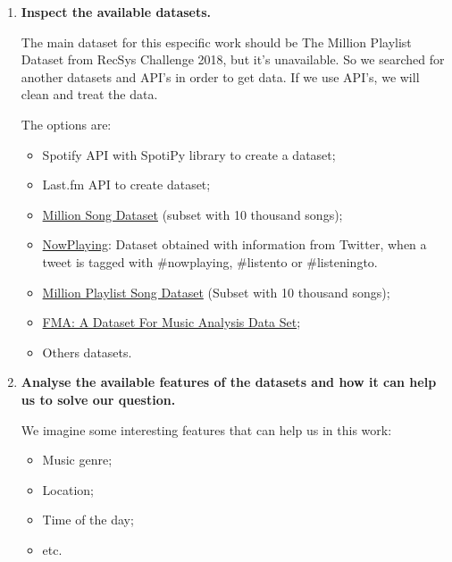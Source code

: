 \documentclass{article}
\begin{document}
    \begin{enumerate}
        \item \textbf{Inspect the available datasets.}
        
            The main dataset for this especific work should be The Million
            Playlist Dataset from RecSys Challenge 2018, but it's unavailable.
            So we searched for another datasets and API's in order to get data.
            If we use API's, we will clean and treat the data.
        
            The options are:

            \begin{itemize}
                \item Spotify API with SpotiPy library to create a dataset;
                \item Last.fm API to create dataset;
                \item \href{http://millionsongdataset.com/}{Million Song Dataset}
                (subset with 10 thousand songs);
                \item \href{https://dbis.uibk.ac.at/node/263}{NowPlaying}:
                Dataset obtained with information from Twitter, when a tweet is tagged with \#nowplaying, \#listento or \#listeningto.
                \item \href{https://github.com/felipevieira/computacao-e-musica-lsd/blob/master/sbcm-2017/Datasets/MPSD%20v1.0.csv}{Million Playlist Song Dataset}
                (Subset with 10 thousand songs);
                \item \href{https://github.com/mdeff/fma}{FMA:
                A Dataset For Music Analysis Data Set};
                \item Others datasets.
            \end{itemize}

        \item \textbf{Analyse the available features of the datasets and how it
        can help us to solve our question.}
        
            We imagine some interesting features that can help us in this work:

            \begin{itemize}
                \item Music genre;
                \item Location;
                \item Time of the day;
                \item etc.
            \end{itemize}


\end{enumerate}
\end{document}
